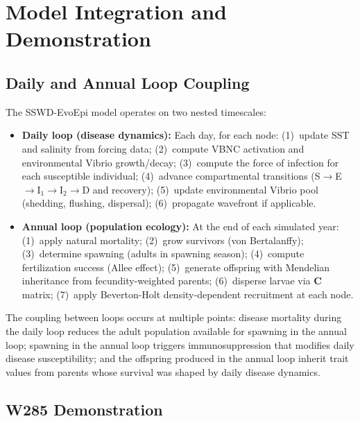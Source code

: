 \documentclass[11pt,letterpaper]{article}
\begin{document}
\section{Model Integration and Demonstration}
\label{sec:integration}

\subsection{Daily and Annual Loop Coupling}

The SSWD-EvoEpi model operates on two nested timescales:

\begin{itemize}
  \item \textbf{Daily loop (disease dynamics):} Each day, for each node: (1)~update SST and salinity from forcing data; (2)~compute VBNC activation and environmental Vibrio growth/decay; (3)~compute the force of infection for each susceptible individual; (4)~advance compartmental transitions (S$\to$E$\to$I$_1$$\to$I$_2$$\to$D and recovery); (5)~update environmental Vibrio pool (shedding, flushing, dispersal); (6)~propagate wavefront if applicable.
  
  \item \textbf{Annual loop (population ecology):} At the end of each simulated year: (1)~apply natural mortality; (2)~grow survivors (von Bertalanffy); (3)~determine spawning (adults in spawning season); (4)~compute fertilization success (Allee effect); (5)~generate offspring with Mendelian inheritance from fecundity-weighted parents; (6)~disperse larvae via $\mathbf{C}$ matrix; (7)~apply Beverton-Holt density-dependent recruitment at each node.
\end{itemize}

The coupling between loops occurs at multiple points: disease mortality during the daily loop reduces the adult population available for spawning in the annual loop; spawning in the annual loop triggers immunosuppression that modifies daily disease susceptibility; and the offspring produced in the annual loop inherit trait values from parents whose survival was shaped by daily disease dynamics.

\subsection{W285 Demonstration}
\end{document}
